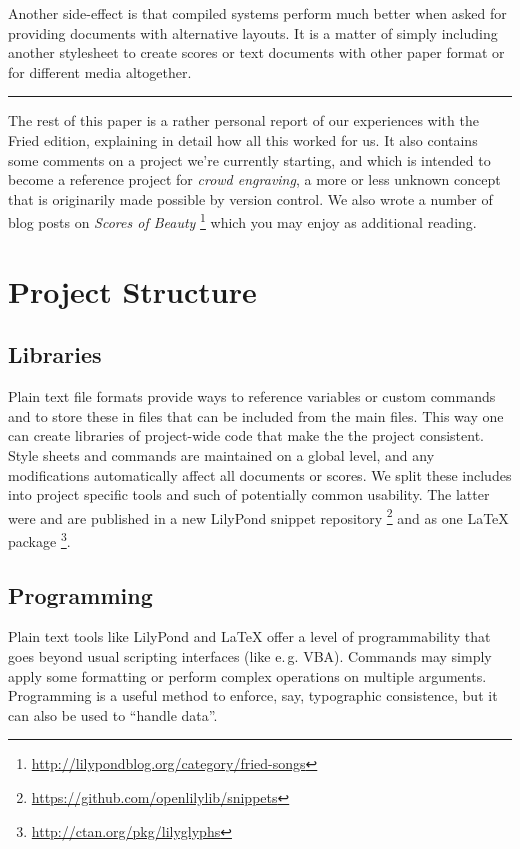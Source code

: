 \documentclass[11pt,a4paper]{article}
\begin{document}
Another side-effect is that compiled systems perform much better when asked for providing
documents with alternative layouts. It is a matter of simply including another stylesheet
to create scores or text documents with other paper format or for different media altogether.

\bigskip
\hrule

\bigskip
The rest of this paper is a rather personal report of our experiences with the Fried
edition, explaining in detail how all this worked for us.  It also contains
some comments on a project we're currently starting, and which is intended to become
a reference project for \emph{crowd engraving}, a more or less unknown concept that is
originarily made possible by version control. We also wrote a number of blog posts on
\emph{Scores of Beauty}%
\footnote{\url{http://lilypondblog.org/category/fried-songs}}
which you may enjoy as additional reading.

\section{Project Structure}


\subsection{Libraries}
Plain text file formats provide ways to reference variables or custom
commands and to store these in files that can be included from the
main files. This way one can create libraries of project-wide code
that make the the project consistent. Style sheets and commands are
maintained on a global level, and any modifications automatically
affect all documents or scores.
We split these includes into project specific tools and such of potentially
common usability. The latter were and are published in a new LilyPond snippet
repository%
\footnote{\url{https://github.com/openlilylib/snippets}}
and as one \LaTeX{} package%
\footnote{\url{http://ctan.org/pkg/lilyglyphs}}.

\subsection{Programming}
Plain text tools like LilyPond and \LaTeX{} offer a level of programmability that
goes beyond usual scripting interfaces (like e.\,g. VBA). Commands may simply apply
some formatting or perform complex operations on multiple arguments.
Programming is a useful method to enforce, say, typographic consistence, but it can
also be used to “handle data”.
\end{document}
